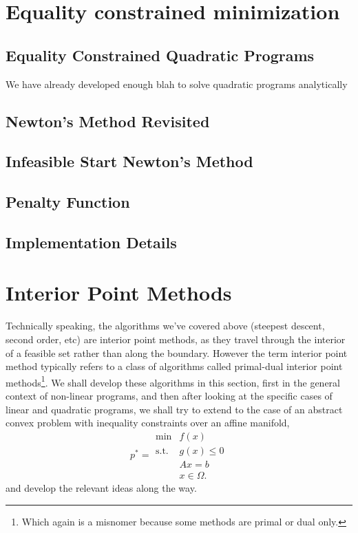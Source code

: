 \documentclass[11pt]{article}
\numberwithin{equation}{section}
\theoremstyle{definition}
\newcommand{\tst}{\text{s.t.}}
\begin{document}
\section{Equality constrained minimization}
\subsection{Equality Constrained Quadratic Programs}
We have already developed enough blah to solve quadratic programs analytically
\subsection{Newton's Method Revisited}
\subsection{Infeasible Start Newton's Method}
\subsection{Penalty Function}
\subsection{Implementation Details}
\section{Interior Point Methods}
Technically speaking, the algorithms we've covered above (steepest descent, second order, etc) are interior point methods, as they travel through the interior of a feasible set rather than along the boundary. However the term interior point method typically refers to a class of algorithms called primal-dual interior point methods\footnote{Which again is a misnomer because some methods are primal or dual only.}. We shall develop these algorithms in this section, first in the general context of non-linear programs, and then after looking at the specific cases of linear and quadratic programs, we shall try to extend to the case of an abstract convex problem with inequality constraints over an affine manifold,
\begin{equation}
    p^*=\begin{array}{cc}
         \min & f(x)  \\
         \tst & g(x)\le 0\\
              & Ax=b\\
              & x\in\Omega.
    \end{array}
\end{equation}
and develop the relevant ideas along the way.
\end{document}
